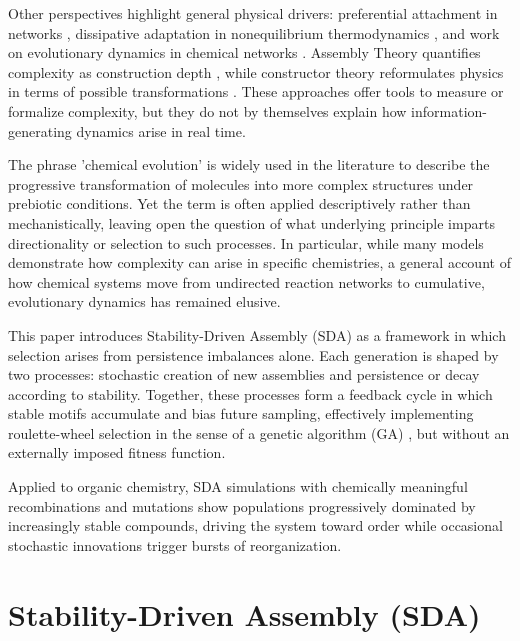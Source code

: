\documentclass[life,article,submit,pdftex,moreauthors]{Definitions/mdpi}
\begin{document}
Other perspectives highlight general physical drivers: preferential attachment in networks \cite{barabasi1999emergence}, dissipative adaptation in nonequilibrium thermodynamics \cite{prigogine1977self, england2015dissipative}, and work on evolutionary dynamics in chemical networks \cite{wu2012origin, nowak2006evolutionary}. Assembly Theory quantifies complexity as construction depth \cite{walker2023nature}, while constructor theory reformulates physics in terms of possible transformations \cite{deutsch2013constructor}. These approaches offer tools to measure or formalize complexity, but they do not by themselves explain how information-generating dynamics arise in real time.

The phrase 'chemical evolution' is widely used in the literature to describe the progressive transformation of molecules into more complex structures under prebiotic conditions. Yet the term is often applied descriptively rather than mechanistically, leaving open the question of what underlying principle imparts directionality or selection to such processes. In particular, while many models demonstrate how complexity can arise in specific chemistries, a general account of how chemical systems move from undirected reaction networks to cumulative, evolutionary dynamics has remained elusive.

This paper introduces Stability-Driven Assembly (SDA) as a framework in which 
selection arises from persistence imbalances alone. Each generation is shaped 
by two processes: stochastic creation of new assemblies and persistence or 
decay according to stability. Together, these processes form a feedback cycle
in which stable motifs accumulate and bias future sampling, effectively implementing roulette-wheel selection in the sense of a genetic algorithm (GA) 
\cite{holland1975adaptation, adler1993marriage}, but without an externally
imposed fitness function.

Applied to organic chemistry, SDA simulations with chemically meaningful
recombinations and mutations show populations progressively dominated by
increasingly stable compounds, driving the system toward order while
occasional stochastic innovations trigger bursts of reorganization.

\section{Stability-Driven Assembly (SDA)}
\end{document}
